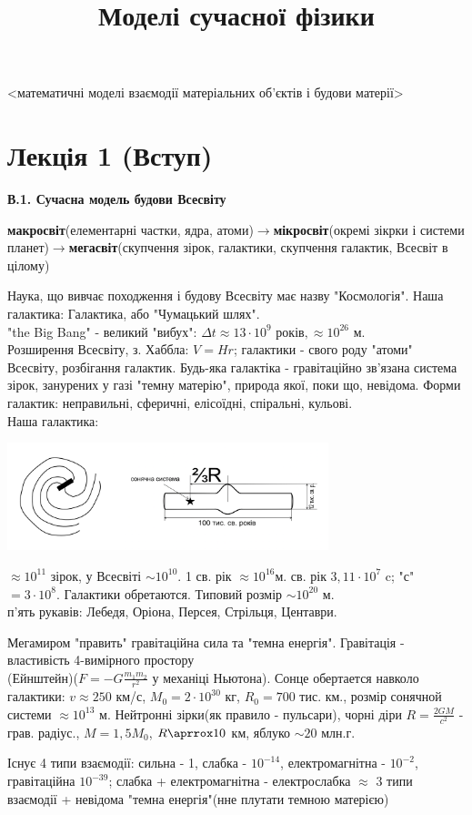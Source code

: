 \documentclass[a4paper,12pt]{article}
\begin{document}
\title{Моделі сучасної фізики}
\maketitle
\date{ }
<математичні моделі взаємодії матеріальних об'єктів і будови матерії>

\newpage
\tableofcontents
\newpage
\section{Лекція 1 (Вступ)}
\textbf{В.1. Сучасна модель будови Всесвіту}

\textbf{макросвіт}(елементарні частки, ядра, атоми)$\rightarrow$\textbf{мікросвіт}(окремі зікрки і системи планет)$\rightarrow$\textbf{мегасвіт}(скупчення зірок, галактики, скупчення галактик, Всесвіт в цілому)

Наука, що вивчає походження і будову Всесвіту має назву "Космологія".
Наша галактика: Галактика, або "Чумацький шлях".
\\"the Big Bang" - великий "вибух": $\Delta t\approx 13\cdot 10^9 \textrm{ років}, \approx 10^{26}\textrm{ м}.$
\\Розширення Всесвіту, з. Хаббла: $V=Hr$; галактики - свого роду "атоми" Всесвіту, розбігання галактик.
Будь-яка галактіка - гравітаційно зв'язана система зірок, занурених у газі "темну матерію", природа якої, поки що, невідома. Форми галактик: неправильні, сферичні, елісоїдні, спіральні, кульові.\\
Наша галактика:

\includegraphics[width=0.7\textwidth]{galaxy0}

$\approx  10^{11}$ зірок, у Всесвіті $\sim 10^{10}$. 1 св. рік $\approx 10^{16}$м. св. рік $3,11\cdot10^7$ c; "с" $= 3\cdot10^8$. Галактики обретаются. Типовий розмір $\sim 10^{20}$ м.
\\
п'ять рукавів:
Лебедя, Оріона, Персея, Стрільця, Центаври.


Мегамиром "править" гравітаційна сила та "темна енергія". Гравітація - властивість 4-вимірного простору\\(Ейнштейн)($F=-G\frac{m_1m_2}{r^2}$ у механіці Ньютона). Сонце обертается навколо галактики: $v\approx 250$ км/с, $M_0=2\cdot10^{30}$ кг, $R_0=700$ тис. км., розмір сонячной системи $\approx 10^{13}$ м. Нейтронні зірки(як правило - пульсари), чорні діри $R=\frac{2GM}{c^2}$ - грав. радіус., $M=1,5M_0$, $R\aprrox10$ км, яблуко $\sim 20$ млн.г.

Існує 4 типи взаємодії: сильна - 1, слабка - $10^{-14}$, електромагнітна - $10^{-2}$, гравітаційна $10^{-39}$; слабка + електромагнітна - електрослабка $\approx$ 3 типи взаємодії + невідома "темна енергія"(нне плутати  темною матерією)
\end{document}
